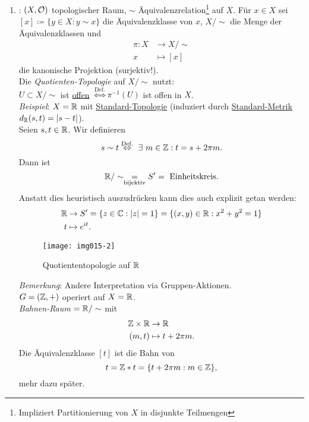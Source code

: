 \begin{remark}
\begin{enumerate}
    \item {}: $ (X, \mathcal{O}) $ topologischer Raum, $ \sim $ Äquivalenzrelation\footnote{Impliziert Partitionierung von $ X $ in disjunkte Teilmengen} auf $ X $. Für $ x \in X $ sei $ [x] \coloneqq  \{ y \in X : y \sim x \} $ die Äquivalenzklasse von $ x $, $ X/\sim $ die Menge der Äquivalenzklassen und
    \begin{align*}
      \pi : X &\to X/\sim \\
      x &\mapsto [x]
    \end{align*}
    die kanonische Projektion (surjektiv!). \\
    Die \emph{Quotienten-Topologie} auf $ X/\sim $ nutzt: \\
    $ U \subset X/\sim $ ist \underline{offen} $ \overset{\text{Def.}}{\Leftrightarrow} \pi^{-1}(U) $ ist offen in $ X $. \\
    \emph{Beispiel}: $ X = \mathbb{R} $ mit \hyperref[bsp:standardtopologie]{Standard-Topologie} (induziert durch \hyperref[bsp:standardmetrik]{Standard-Metrik} $ d_{\mathbb{R}}(s,t) = \vert s-t \vert $). \\
    Seien $ s, t \in \mathbb{R} $. Wir definieren
    \begin{equation*}
      s \sim t \overset{\text{Def.}}{\Leftrightarrow} \ \exists \ m \in \mathbb{Z} : t = s + 2\pi m\text{.}
    \end{equation*}
    Dann ist
    \begin{equation*}
      \mathbb{R}/\sim \underset{\text{bijektiv}}{=} S' = \text{ Einheitskreis}\text{.}
    \end{equation*}
    Anstatt dies heuristisch auszudrücken kann dies auch explizit getan werden:
    \begin{align*}
      \mathbb{R} &\to S' = \{ z \in \mathbb{C} : \vert z \vert = 1 \} = \{ (x, y) \in \mathbb{R} : x^2+y^2 = 1 \} \\
      t &\mapsto e^{\text{\rmfamily i} t}\text{.}
    \end{align*}
    \begin{figure}[H]
      \label{img015-2}
      \texttt{[image: img015-2]}
      \caption{Quotiententopologie auf $ \mathbb{R} $}
    \end{figure}
    \emph{Bemerkung}: Andere Interpretation via Gruppen-Aktionen. \\
    $ G = (\mathbb{Z}, +) $ operiert auf $ X = \mathbb{R} $. \\
    \emph{Bahnen-Raum} $ = \mathbb{R}/\sim $ mit
    \begin{align*}
      \mathbb{Z} \times \mathbb{R} &\to \mathbb{R} \\
      (m, t) &\mapsto t + 2\pi m\text{.}
    \end{align*}
    Die Äquivalenzklasse $ [t] $ ist die Bahn von
    \begin{equation*}
      t = \mathbb{Z}*t = \{ t+2\pi m : m \in \mathbb{Z} \}\text{,}
    \end{equation*}
    mehr dazu später.
  \end{enumerate}
\end{remark}

